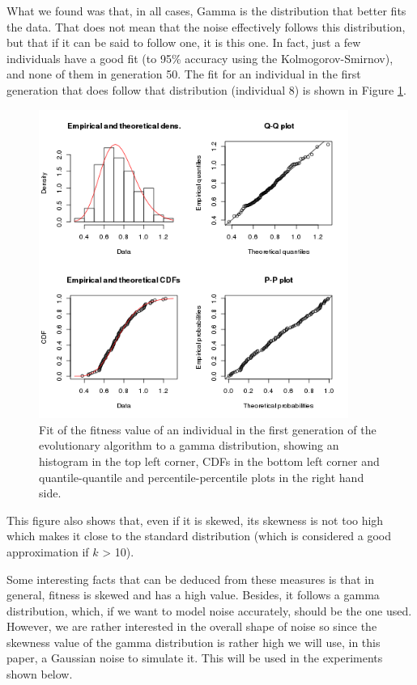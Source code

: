 \documentclass{llncs}
\begin{document}
What we found was that, in all cases, Gamma is the distribution that
better fits the data. That does not mean that the noise effectively
follows this distribution, but that if it can be said to follow one,
it is this one. In fact, just a few individuals have a good fit (to
95\% accuracy using the Kolmogorov-Smirnov), and none of them in
generation 50. The fit for an individual in the first generation that
does follow that distribution (individual 8) is shown in Figure
\ref{fig:indi8}. 
%
\begin{figure}[h]
\centering
\includegraphics[width=0.9\textwidth]{../images/indi8.png}
\caption{Fit of the fitness value of an individual in the first
  generation of the evolutionary algorithm to a gamma distribution,
  showing an histogram in the top left corner, CDFs in the bottom left
  corner and quantile-quantile and percentile-percentile plots in the
  right hand side. \label{fig:indi8}}
\end{figure}

This figure also shows that, even if it is skewed, its skewness is not
too high which makes it close to the standard distribution (which is
considered a good
approximation if $k$ > 10). 

Some interesting facts that can be deduced from these measures is that
in general, fitness is skewed and has a high value. Besides, it
follows a gamma distribution, which, if we want to model noise
accurately, should be the one used. However, we are rather interested
in the overall shape of noise so since the skewness value of the gamma
distribution is rather high we will use, in this paper, a Gaussian
noise to simulate it. This will be used in the experiments shown
below. 
\end{document}
